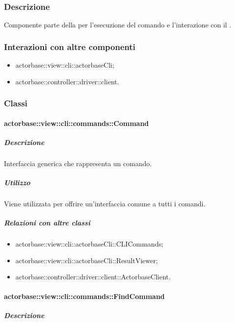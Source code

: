 \documentclass{scalatekids-article}
\begin{document}
\subsubsection{Descrizione}

Componente parte della  per l'esecuzione del comando e l'interazione con il .

\subsubsection{Interazioni con altre componenti}

\begin{itemize}
\item actorbase::view::cli::actorbaseCli;
\item actorbase::controller::driver::client.
\end{itemize}

\subsubsection{Classi}

\paragraph{actorbase::view::cli::commands::Command}

\subparagraph{Descrizione}

Interfaccia generica che rappresenta un comando.

\subparagraph{Utilizzo}

Viene utilizzata per offrire un'interfaccia comune a tutti i comandi.

\subparagraph{Relazioni con altre classi}

\begin{itemize}
\item actorbase::view::cli::actorbaseCli::CLICommands;
\item actorbase::view::cli::actorbaseCli::ResultViewer;
\item actorbase::controller::driver::client::ActorbaseClient.
\end{itemize}

\paragraph{actorbase::view::cli::commands::FindCommand}

\subparagraph{Descrizione}
\end{document}
